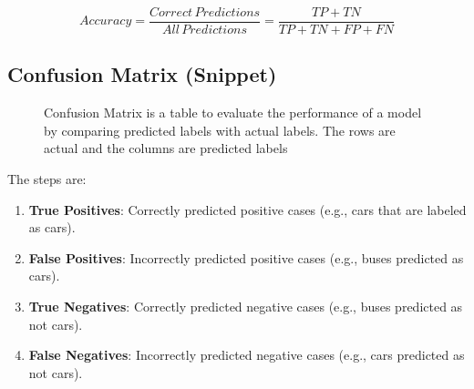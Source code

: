 \documentclass[12pt]{article}
\begin{document}
\[ Accuracy = \frac{Correct\,Predictions}{All\,Predictions} = \frac{TP+TN}{TP+TN+FP+FN} \]
\subsection{Confusion Matrix (Snippet)}
\begin{figure}[H]
\centering
{}
    \caption{Confusion Matrix is a table to evaluate the performance of a model by comparing predicted labels with actual labels. The rows are actual and the columns are predicted labels}
\end{figure}
    The steps are:
\begin{enumerate}
    \item \textbf{True Positives}: Correctly predicted positive cases (e.g., cars that are labeled as cars).
\item \textbf{False Positives}: Incorrectly predicted positive cases (e.g., buses predicted as cars).
\item \textbf{True Negatives}: Correctly predicted negative cases (e.g., buses predicted as not cars).
\item \textbf{False Negatives}: Incorrectly predicted negative cases (e.g., cars predicted as not cars).
\end{enumerate}
\end{document}
